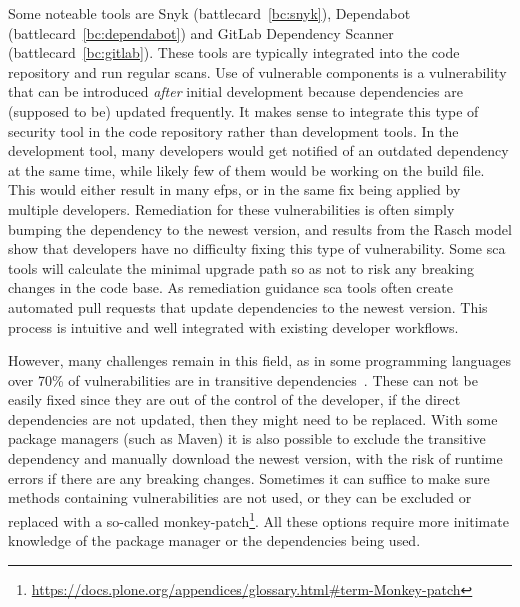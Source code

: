 Some noteable tools are Snyk (battlecard~\ref{bc:snyk}), Dependabot (battlecard~\ref{bc:dependabot}) and GitLab Dependency Scanner (battlecard~\ref{bc:gitlab}).
These tools are typically integrated into the code repository and run regular scans.
Use of vulnerable components is a vulnerability that can be introduced \textit{after} initial development because dependencies are (supposed to be) updated frequently.
It makes sense to integrate this type of security tool in the code repository rather than development tools.
In the development tool, many developers would get notified of an outdated dependency at the same time, while likely few of them would be working on the build file.
This would either result in many \glspl{efp}, or in the same fix being applied by multiple developers.
Remediation for these vulnerabilities is often simply bumping the dependency to the newest version, and results from the Rasch model show that developers have no difficulty fixing this type of vulnerability.
Some \gls{sca} tools will calculate the minimal upgrade path so as not to risk any breaking changes in the code base.
As remediation guidance \gls{sca} tools often create automated pull requests that update dependencies to the newest version.
This process is intuitive and well integrated with existing developer workflows.

However, many challenges remain in this field, as in some programming languages over 70\% of vulnerabilities are in transitive dependencies~\cite{snyk2020}.
These can not be easily fixed since they are out of the control of the developer, if the direct dependencies are not updated, then they might need to be replaced.
With some package managers (such as Maven) it is also possible to exclude the transitive dependency and manually download the newest version, with the risk of runtime errors if there are any breaking changes.
Sometimes it can suffice to make sure methods containing vulnerabilities are not used, or they can be excluded or replaced with a so-called monkey-patch\footnote{\url{https://docs.plone.org/appendices/glossary.html\#term-Monkey-patch}}.
All these options require more initimate knowledge of the package manager or the dependencies being used.




